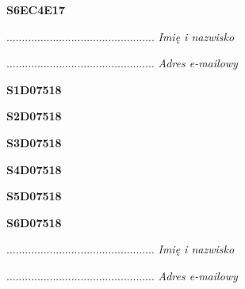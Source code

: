 \begin{turn}{90}\huge \textbf{S6EC4E17}\end{turn}

\begin{turn}{90}\begin{minipage}{\linewidth} \vspace{20mm} ................................................  \textit{Imię i nazwisko}\end{minipage}\end{turn}

\begin{turn}{90}\begin{minipage}{\linewidth} \vspace{20mm} ................................................  \textit{Adres e-mailowy}\end{minipage}\end{turn}

\begin{turn}{90}\huge \textbf{S1D07518}\end{turn}

\begin{turn}{90}\huge \textbf{S2D07518}\end{turn}

\begin{turn}{90}\huge \textbf{S3D07518}\end{turn}

\begin{turn}{90}\huge \textbf{S4D07518}\end{turn}

\begin{turn}{90}\huge \textbf{S5D07518}\end{turn}

\begin{turn}{90}\huge \textbf{S6D07518}\end{turn}

\begin{turn}{90}\begin{minipage}{\linewidth} \vspace{20mm} ................................................  \textit{Imię i nazwisko}\end{minipage}\end{turn}

\begin{turn}{90}\begin{minipage}{\linewidth} \vspace{20mm} ................................................  \textit{Adres e-mailowy}\end{minipage}\end{turn}

